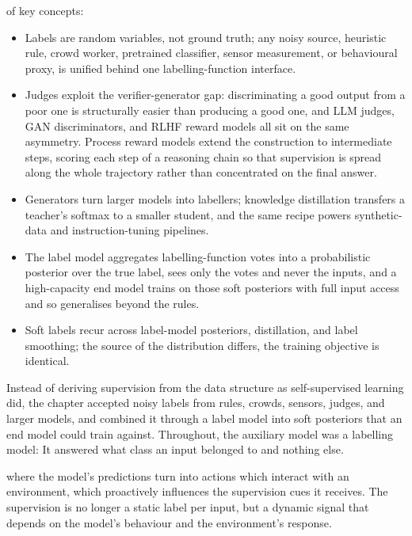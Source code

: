 \vspace{1.5em}

 of key concepts:
\begin{itemize}
    \item Labels are random variables, not ground truth; any noisy source, heuristic rule, crowd worker, pretrained classifier, sensor measurement, or behavioural proxy, is unified behind one labelling-function interface.
    \item Judges exploit the verifier-generator gap: discriminating a good output from a poor one is structurally easier than producing a good one, and LLM judges, GAN discriminators, and RLHF reward models all sit on the same asymmetry. Process reward models extend the construction to intermediate steps, scoring each step of a reasoning chain so that supervision is spread along the whole trajectory rather than concentrated on the final answer.
    \item Generators turn larger models into labellers; knowledge distillation transfers a teacher's softmax to a smaller student, and the same recipe powers synthetic-data and instruction-tuning pipelines.
    \item The label model aggregates labelling-function votes into a probabilistic posterior over the true label, sees only the votes and never the inputs, and a high-capacity end model trains on those soft posteriors with full input access and so generalises beyond the rules.
    \item Soft labels recur across label-model posteriors, distillation, and label smoothing; the source of the distribution differs, the training objective is identical.
\end{itemize}

\vspace{2.5em}


Instead of deriving supervision from the data structure as self-supervised learning did,
the chapter accepted noisy labels from rules, crowds, sensors, judges, and larger models,
and combined it through a label model into soft posteriors that an end model could train against.
Throughout, the auxiliary model was a labelling model: It answered what class an 
input belonged to and nothing else.

where the model's predictions turn into actions which interact with an environment,
which proactively influences the supervision cues it receives. 
The supervision is no longer a static label per input, but a dynamic signal 
that depends on the model's behaviour and the environment's response. 

